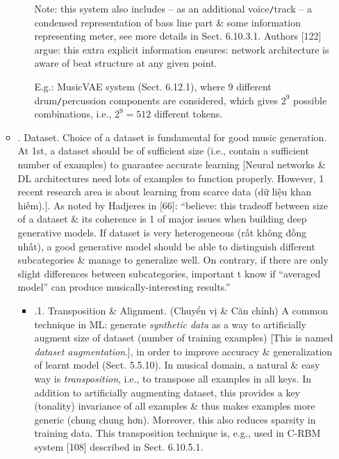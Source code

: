 \documentclass{article}
\begin{document}
\begin{itemize}
\begin{itemize}
\begin{itemize}
			Note: this system also includes -- as an additional voice{\tt/}track -- a condensed representation of bass line part \& some information representing meter, see more details in Sect. 6.10.3.1. Authors [122] argue: this extra explicit information ensures: network architecture is aware of beat structure at any given point.
			
			E.g.: MusicVAE system (Sect. 6.12.1), where 9 different drum{\tt/}percussion components are considered, which gives $2^9$ possible combinations, i.e., $2^9 = 512$ different tokens.
		\end{itemize}
		\item {. Dataset.} Choice of a dataset is fundamental for good music generation. At 1st, a dataset should be of sufficient size (i.e., contain a sufficient number of examples) to guarantee accurate learning [Neural networks \& DL architectures need lots of examples to function properly. However, 1 recent research area is about learning from scarce data (dữ liệu khan hiếm).]. As noted by Hadjeres in [66]: ``believe: this tradeoff between size of a dataset \& its coherence is 1 of major issues when building deep generative models. If dataset is very heterogeneous (rất không đồng nhất), a good generative model should be able to distinguish different subcategories \& manage to generalize well. On contrary, if there are only slight differences between subcategories, important t know if ``averaged model'' can produce musically-interesting results.''
		\begin{itemize}
			\item {.1. Transposition \& Alignment.} (Chuyển vị \& Căn chỉnh) A common technique in ML: generate {\it synthetic data} as a way to artificially augment size of dataset (number of training examples) [This is named {\it dataset augmentation}.], in order to improve accuracy \& generalization of learnt model (Sect. 5.5.10). In musical domain, a natural \& easy way is {\it transposition}, i.e., to transpose all examples in all keys. In addition to artificially augmenting dataset, this  provides a key (tonality) invariance of all examples \& thus makes examples more generic (chung chung hơn). Moreover, this also reduces sparsity in training data. This transposition technique is, e.g., used in C-RBM system [108] described in Sect. 6.10.5.1.
			

\end{itemize}
\end{itemize}
\end{itemize}
\end{document}
